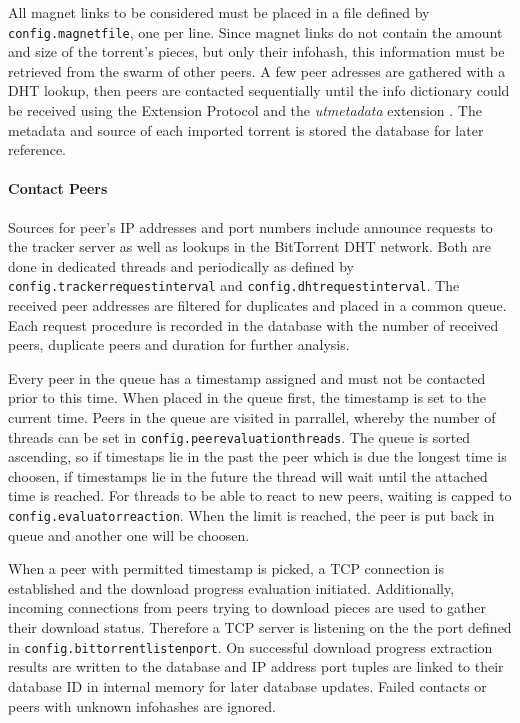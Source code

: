 \documentclass[10pt, a4paper]{scrartcl} %
\renewcommand{\_}{\origunderscore\allowbreak}
\newcommand{\config}[1]{\texttt{config.\allowbreak #1}}
\begin{document}
All magnet links \cite{bep9} to be considered must be placed in a file defined by \config{magnet\_file}, one per line. Since magnet links do not contain the amount and size of the torrent's pieces, but only their infohash, this information must be retrieved from the swarm of other peers. A few peer adresses are gathered with a DHT lookup, then peers are contacted sequentially until the info dictionary could be received using the Extension Protocol \cite{bep10} and the \emph{ut\_metadata} extension \cite{bep9}. The metadata and source of each imported torrent is stored the database for later reference.

\paragraph{Contact Peers}
Sources for peer's IP addresses and port numbers include announce requests to the tracker server as well as lookups in the BitTorrent DHT network. Both are done in dedicated threads and periodically as defined by \config{tracker\_request\_interval} and \config{dht\_request\_interval}. The received peer addresses are filtered for duplicates and placed in a common queue. Each request procedure is recorded in the database with the number of received peers, duplicate peers and duration for further analysis.

Every peer in the queue has a timestamp assigned and must not be contacted prior to this time. When placed in the queue first, the timestamp is set to the current time. Peers in the queue are visited in parrallel, whereby the number of threads can be set in \config{peer\_evaluation\_threads}. The queue is sorted ascending, so if timestaps lie in the past the peer which is due the longest time is choosen, if timestamps lie in the future the thread will wait until the attached time is reached. For threads to be able to react to new peers, waiting is capped to \config{evaluator\_reaction}. When the limit is reached, the peer is put back in queue and another one will be choosen.

When a peer with permitted timestamp is picked, a TCP connection is established and the download progress evaluation initiated. Additionally, incoming connections from peers trying to download pieces are used to gather their download status. Therefore a TCP server is listening on the the port defined in \config{bittorrent\_listen\_port}. On successful download progress extraction results are written to the database and IP address port tuples are linked to their database ID in internal memory for later database updates. Failed contacts or peers with unknown infohashes are ignored.
\end{document}
